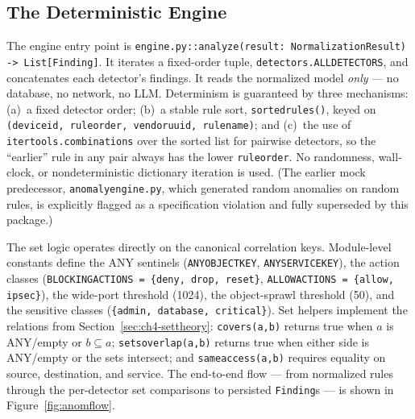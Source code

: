 \documentclass[12pt,a4paper]{report}
\renewcommand{\_}{\textunderscore\allowbreak}
\begin{document}
\subsection{The Deterministic Engine}
\label{sec:ch4-det-engine}

The engine entry point is \texttt{engine.py::analyze(result: NormalizationResult) -> List[Finding]}. It iterates a fixed-order tuple, \texttt{detectors.ALL\_DETECTORS}, and concatenates each detector's findings. It reads the normalized model \emph{only} --- no database, no network, no LLM. Determinism is guaranteed by three mechanisms: (a)~a fixed detector order; (b)~a stable rule sort, \texttt{\_sorted\_rules()}, keyed on \texttt{(device\_id, rule\_order, vendor\_uuid, rule\_name)}; and (c)~the use of \texttt{itertools.combinations} over the sorted list for pairwise detectors, so the ``earlier'' rule in any pair always has the lower \texttt{rule\_order}. No randomness, wall-clock, or nondeterministic dictionary iteration is used. (The earlier mock predecessor, \texttt{anomaly\_engine.py}, which generated random anomalies on random rules, is explicitly flagged as a specification violation and fully superseded by this package.)

The set logic operates directly on the canonical correlation keys. Module-level constants define the ANY sentinels (\texttt{ANY\_OBJECT\_KEY}, \texttt{ANY\_SERVICE\_KEY}), the action classes (\texttt{\_BLOCKING\_ACTIONS = \{deny, drop, reset\}}, \texttt{\_ALLOW\_ACTIONS = \{allow, ipsec\}}), the wide-port threshold (1024), the object-sprawl threshold (50), and the sensitive classes (\texttt{\{admin, database, critical\}}). Set helpers implement the relations from Section~\ref{sec:ch4-settheory}: \texttt{\_covers(a,b)} returns true when $a$ is ANY/empty or $b \subseteq a$; \texttt{\_sets\_overlap(a,b)} returns true when either side is ANY/empty or the sets intersect; and \texttt{\_same\_access(a,b)} requires equality on source, destination, and service. The end-to-end flow --- from normalized rules through the per-detector set comparisons to persisted \texttt{Finding}s --- is shown in Figure~\ref{fig:anomflow}.
\end{document}
